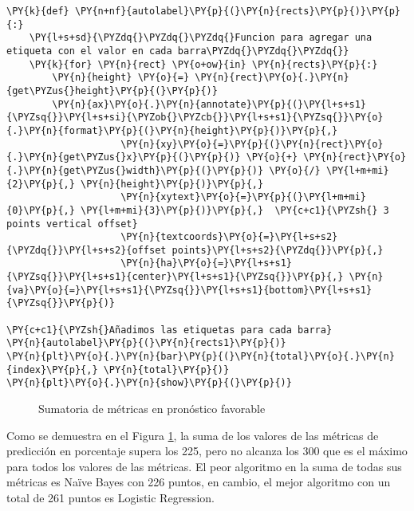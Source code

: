 \begin{tcolorbox}[breakable, size=fbox, boxrule=1pt, pad at break*=1mm,colback=cellbackground, colframe=cellborder]
\begin{Verbatim}[commandchars=\\\{\}]
\PY{k}{def} \PY{n+nf}{autolabel}\PY{p}{(}\PY{n}{rects}\PY{p}{)}\PY{p}{:}
    \PY{l+s+sd}{\PYZdq{}\PYZdq{}\PYZdq{}Funcion para agregar una etiqueta con el valor en cada barra\PYZdq{}\PYZdq{}\PYZdq{}}
    \PY{k}{for} \PY{n}{rect} \PY{o+ow}{in} \PY{n}{rects}\PY{p}{:}
        \PY{n}{height} \PY{o}{=} \PY{n}{rect}\PY{o}{.}\PY{n}{get\PYZus{}height}\PY{p}{(}\PY{p}{)}
        \PY{n}{ax}\PY{o}{.}\PY{n}{annotate}\PY{p}{(}\PY{l+s+s1}{\PYZsq{}}\PY{l+s+si}{\PYZob{}\PYZcb{}}\PY{l+s+s1}{\PYZsq{}}\PY{o}{.}\PY{n}{format}\PY{p}{(}\PY{n}{height}\PY{p}{)}\PY{p}{,}
                    \PY{n}{xy}\PY{o}{=}\PY{p}{(}\PY{n}{rect}\PY{o}{.}\PY{n}{get\PYZus{}x}\PY{p}{(}\PY{p}{)} \PY{o}{+} \PY{n}{rect}\PY{o}{.}\PY{n}{get\PYZus{}width}\PY{p}{(}\PY{p}{)} \PY{o}{/} \PY{l+m+mi}{2}\PY{p}{,} \PY{n}{height}\PY{p}{)}\PY{p}{,}
                    \PY{n}{xytext}\PY{o}{=}\PY{p}{(}\PY{l+m+mi}{0}\PY{p}{,} \PY{l+m+mi}{3}\PY{p}{)}\PY{p}{,}  \PY{c+c1}{\PYZsh{} 3 points vertical offset}
                    \PY{n}{textcoords}\PY{o}{=}\PY{l+s+s2}{\PYZdq{}}\PY{l+s+s2}{offset points}\PY{l+s+s2}{\PYZdq{}}\PY{p}{,}
                    \PY{n}{ha}\PY{o}{=}\PY{l+s+s1}{\PYZsq{}}\PY{l+s+s1}{center}\PY{l+s+s1}{\PYZsq{}}\PY{p}{,} \PY{n}{va}\PY{o}{=}\PY{l+s+s1}{\PYZsq{}}\PY{l+s+s1}{bottom}\PY{l+s+s1}{\PYZsq{}}\PY{p}{)}

\PY{c+c1}{\PYZsh{}Añadimos las etiquetas para cada barra}
\PY{n}{autolabel}\PY{p}{(}\PY{n}{rects1}\PY{p}{)}
\PY{n}{plt}\PY{o}{.}\PY{n}{bar}\PY{p}{(}\PY{n}{total}\PY{o}{.}\PY{n}{index}\PY{p}{,} \PY{n}{total}\PY{p}{)}
\PY{n}{plt}\PY{o}{.}\PY{n}{show}\PY{p}{(}\PY{p}{)}
\end{Verbatim}
\end{tcolorbox}

\begin{center}
    	\begin{figure}[H]
	\centering
	\caption{Sumatoria de métricas en pronóstico favorable}
	\label{fig:smpf}
	\end{figure}
\end{center}
    
    Como se demuestra en el Figura \ref{fig:smpf}, la suma de los valores de las métricas de predicción en porcentaje supera los 225, pero no alcanza los 300 que es el máximo para todos los valores de las métricas. El peor algoritmo en la suma de todas sus métricas es Naïve Bayes con 226 puntos, en cambio, el mejor algoritmo con un total de 261 puntos es Logistic Regression.

